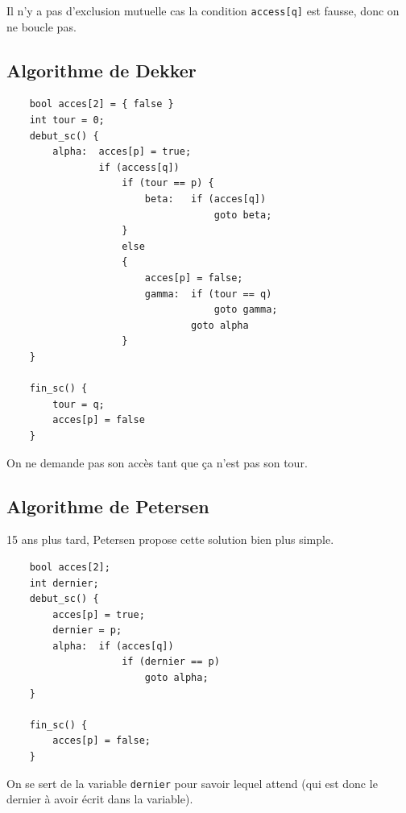 \documentclass[11pt]{article}
\begin{document}
Il n'y a pas d'exclusion mutuelle cas la condition \texttt{access[q]} est fausse, donc on ne boucle pas.

\subsection{Algorithme de Dekker}
\begin{verbatim}    
    bool acces[2] = { false }
    int tour = 0;
    debut_sc() {
        alpha:  acces[p] = true;
                if (access[q])
                    if (tour == p) {
                        beta:   if (acces[q])
                                    goto beta;
                    }
                    else
                    {
                        acces[p] = false;
                        gamma:  if (tour == q)
                                    goto gamma;
                                goto alpha
                    }
    }

    fin_sc() {
        tour = q;
        acces[p] = false
    }
\end{verbatim}

On ne demande pas son accès tant que ça n'est pas son tour.

\subsection{Algorithme de Petersen}
15 ans plus tard, Petersen propose cette solution bien plus simple.

\begin{verbatim}    
    bool acces[2];
    int dernier;
    debut_sc() {
        acces[p] = true;
        dernier = p;
        alpha:  if (acces[q])
                    if (dernier == p)
                        goto alpha;
    }

    fin_sc() {
        acces[p] = false;
    }
\end{verbatim}

On se sert de la variable \texttt{dernier} pour savoir lequel attend (qui est donc le dernier à avoir écrit dans la variable).
\end{document}
